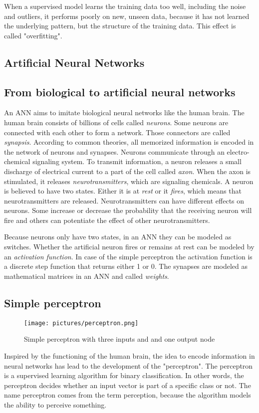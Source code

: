 When a supervised model learns the training data too well, including the noise and outliers, it performs poorly on new, unseen data, because it has not learned the underlying pattern, but the structure of the training data. This effect is called "overfitting".
\cite{haykin2009neural,knudsen1994supervised}

\subsection{Artificial Neural Networks}
\subsection*{From biological to artificial neural networks}
An \acf{ANN} aims to imitate biological neural networks like the human brain. The human brain consists of billions of cells called \textit{neurons}. Some neurons are connected with each other to form a network. Those connectors are called \textit{synapsis}. According to common theories, all memorized information is encoded in the network of neurons and synapses. Neurons communicate through an electro-chemical signaling system. To transmit information, a neuron releases a small discharge of electrical current to a part of the cell called \textit{axon}. When the axon is stimulated, it releases \textit{neurotransmitters}, which are signaling chemicals. 
A neuron is believed to have two states. Either it is at \textit{rest} or it \textit{fires}, which means that neurotransmitters are released. 
Neurotransmitters can have different effects on neurons. Some increase or decrease the probability that the receiving neuron will fire and others can potentiate the effect of other neurotransmitters.

Because neurons only have two states, in an \ac{ANN} they can be modeled as switches. Whether the artificial neuron fires or remains at rest can be modeled by an \textit{activation function}. In case of the simple perceptron the activation function is a discrete step function that returns either 1 or 0. The synapses are modeled as mathematical matrices in an \ac{ANN} and called \textit{weights}.
\cite{haykin2009neural,knudsen1994supervised}

\subsection*{Simple perceptron}
\begin{figure}[ht]
    \centering 
    \texttt{[image: pictures/perceptron.png]}
    \caption{Simple perceptron with three inputs and and one output node \cite{nielsen2015neural}}
    \label{pic:perceptron}    %
\end{figure}
Inspired by the functioning of the human brain, the idea to encode information in neural networks has lead to the development of the "perceptron". The perceptron is a supervised learning algorithm for binary classification. In other words, the perceptron decides whether an input vector is part of a specific class or not. The name perceptron comes from the term perception, because the algorithm models the ability to perceive something. 

